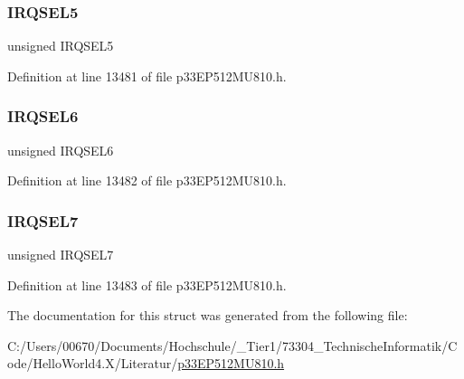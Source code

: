 \subsubsection{\texorpdfstring{I\+R\+Q\+S\+E\+L5}{IRQSEL5}}
{\footnotesize\ttfamily unsigned I\+R\+Q\+S\+E\+L5}



Definition at line 13481 of file p33\+E\+P512\+M\+U810.\+h.

\mbox{\label{structtag_d_m_a11_r_e_q_b_i_t_s_ace52408ef8c29561f3c56a3fbcbc8217}} 
\subsubsection{\texorpdfstring{I\+R\+Q\+S\+E\+L6}{IRQSEL6}}
{\footnotesize\ttfamily unsigned I\+R\+Q\+S\+E\+L6}



Definition at line 13482 of file p33\+E\+P512\+M\+U810.\+h.

\mbox{\label{structtag_d_m_a11_r_e_q_b_i_t_s_acce7dedecdf1f53cdbead3edf7c5d53a}} 
\subsubsection{\texorpdfstring{I\+R\+Q\+S\+E\+L7}{IRQSEL7}}
{\footnotesize\ttfamily unsigned I\+R\+Q\+S\+E\+L7}



Definition at line 13483 of file p33\+E\+P512\+M\+U810.\+h.



The documentation for this struct was generated from the following file\+:\begin{DoxyCompactItemize}
\item 
C\+:/\+Users/00670/\+Documents/\+Hochschule/\+\_\+\+Tier1/73304\+\_\+\+Technische\+Informatik/\+Code/\+Hello\+World4.\+X/\+Literatur/\hyperlink{p33_e_p512_m_u810_8h}{p33\+E\+P512\+M\+U810.\+h}\end{DoxyCompactItemize}
